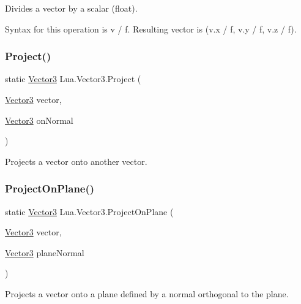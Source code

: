 Divides a vector by a scalar (float). 

Syntax for this operation is {\ttfamily v / f}. Resulting vector is {\ttfamily (v.\+x / f, v.\+y / f, v.\+z / f)}. \mbox{\label{class_lua_1_1_vector3_aa9b7aad25b72d46c5e49e847bbc41353}} 
\subsubsection{\texorpdfstring{Project()}{Project()}}
{\footnotesize\ttfamily static \mbox{\hyperlink{class_lua_1_1_vector3}{Vector3}} Lua.\+Vector3.\+Project (\begin{DoxyParamCaption}\item[{\mbox{\hyperlink{class_lua_1_1_vector3}{Vector3}}}]{vector,  }\item[{\mbox{\hyperlink{class_lua_1_1_vector3}{Vector3}}}]{on\+Normal }\end{DoxyParamCaption})\hspace{0.3cm}{\ttfamily [static]}}



Projects a vector onto another vector. 

\mbox{\label{class_lua_1_1_vector3_af4bc2b40c64c31d8ade94277052e46d1}} 
\subsubsection{\texorpdfstring{ProjectOnPlane()}{ProjectOnPlane()}}
{\footnotesize\ttfamily static \mbox{\hyperlink{class_lua_1_1_vector3}{Vector3}} Lua.\+Vector3.\+Project\+On\+Plane (\begin{DoxyParamCaption}\item[{\mbox{\hyperlink{class_lua_1_1_vector3}{Vector3}}}]{vector,  }\item[{\mbox{\hyperlink{class_lua_1_1_vector3}{Vector3}}}]{plane\+Normal }\end{DoxyParamCaption})\hspace{0.3cm}{\ttfamily [static]}}



Projects a vector onto a plane defined by a normal orthogonal to the plane. 

\mbox{\label{class_lua_1_1_vector3_a6973141d227d4b18eb09caaa3cb965b4}} 
